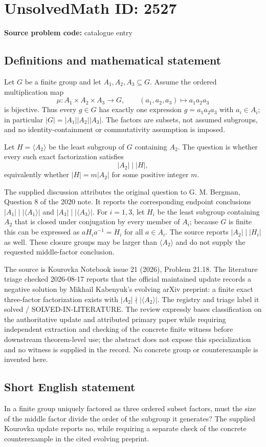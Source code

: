 \documentclass[11pt]{article}
\begin{document}
\section*{UnsolvedMath ID: 2527}
\textbf{Source problem code:} catalogue entry
\subsection{Definitions and mathematical statement}
Let $G$ be a finite group and let $A_1,A_2,A_3\subseteq G$. Assume the ordered multiplication map
\[\mu:A_1\times A_2\times A_3\to G,\qquad(a_1,a_2,a_3)\mapsto a_1a_2a_3\]
is bijective. Thus every $g\in G$ has exactly one expression $g=a_1a_2a_3$ with $a_i\in A_i$; in particular $|G|=|A_1||A_2||A_3|$. The factors are subsets, not assumed subgroups, and no identity-containment or commutativity assumption is imposed.

Let $H=\langle A_2\rangle$ be the least subgroup of $G$ containing $A_2$. The question is whether every such exact factorization satisfies
\[|A_2|\mid |H|,\]
equivalently whether $|H|=m|A_2|$ for some positive integer $m$.

The supplied discussion attributes the original question to G. M. Bergman, Question 8 of the 2020 note. It reports the corresponding endpoint conclusions $|A_1|\mid|\langle A_1\rangle|$ and $|A_3|\mid|\langle A_3\rangle|$. For $i=1,3$, let $H_i$ be the least subgroup containing $A_2$ that is closed under conjugation by every member of $A_i$; because $G$ is finite this can be expressed as $aH_ia^{-1}=H_i$ for all $a\in A_i$. The source reports $|A_2|\mid|H_i|$ as well. These closure groups may be larger than $\langle A_2\rangle$ and do not supply the requested middle-factor conclusion.

The source is Kourovka Notebook issue 21 (2026), Problem 21.18. The literature triage checked 2026-08-17 reports that the official maintained update records a negative solution by Mikhail Kabenyuk's evolving arXiv preprint: a finite exact three-factor factorization exists with $|A_2|\nmid|\langle A_2\rangle|$. The registry and triage label it solved / SOLVED-IN-LITERATURE. The review expressly bases classification on the authoritative update and attributed primary paper while requiring independent extraction and checking of the concrete finite witness before downstream theorem-level use; the abstract does not expose this specialization and no witness is supplied in the record. No concrete group or counterexample is invented here.
\subsection{Short English statement}
In a finite group uniquely factored as three ordered subset factors, must the size of the middle factor divide the order of the subgroup it generates? The supplied Kourovka update reports no, while requiring a separate check of the concrete counterexample in the cited evolving preprint.
\end{document}
